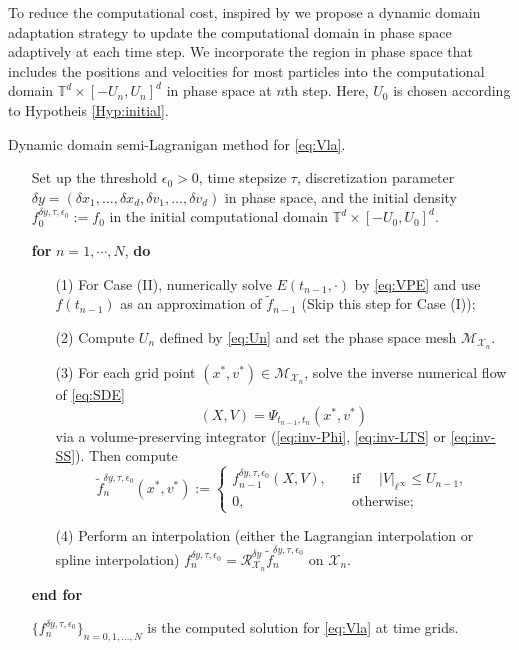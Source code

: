 \documentclass[11pt,reqno]{amsproc}
\numberwithin{equation}{section}
\begin{document}
To reduce the computational cost, inspired by \cite{LR23} we propose a dynamic domain adaptation strategy to update the computational domain in phase space adaptively at each time step. We  incorporate 
the region in phase space that includes the positions and velocities for most particles into the computational domain $\mathbb{T}^d\times [-U_n,U_n]^d$ in phase space at $n$th step. Here, $U_0$ is chosen according to Hypotheis \ref{Hyp:initial}.

\begin{algorithm}[htb]
\caption{Dynamic domain semi-Lagranigan method for \eqref{eq:Vla}.}\label{Algo:2}
\begin{itemize}[leftmargin=*]
\item[]
Set up the threshold $\epsilon_0>0$, time stepsize $\tau$,  discretization parameter  $\delta y=(\delta x_1,\ldots,\delta x_d,\delta v_1,\ldots,\delta v_d)$ in phase space, and the
initial density $f^{\delta y,\tau,\epsilon_0}_{0}:=f_0$ in the initial computational domain $\mathbb{T}^d\times[-U_0,U_0]^d$.

\item[] 
\textbf{for} $n=1, \cdots,N$, \textbf{do}

\begin{enumerate}
\item[(1)]
For Case (II), numerically solve $E(t_{n-1},\cdot)$ by \eqref{eq:VPE} and use $f(t_{n-1})$ as an approximation of $\widetilde{f}_{n-1}$ (Skip this step for Case (I));


\item[(2)]
Compute $U_n$ defined by \eqref{eq:Un} and set the phase space mesh
$\mathcal M_{\mathscr{X}_n}$. 



\item[(3)]
For each grid point $(x^*,v^*)\in\mathcal M_{\mathscr{X}_n}$, solve the inverse numerical flow of \eqref{eq:SDE} $$(X,V)=\widehat{\Psi}_{t_{n-1},t_{n}}(x^*,v^*)$$ 
via a volume-preserving integrator (\eqref{eq:inv-Phi}, \eqref{eq:inv-LTS} or \eqref{eq:inv-SS}).  Then compute
\begin{equation*}%
 \tilde{f}^{\delta y,\tau,\epsilon_0}_{n}(x^*,v^*):= 
 \begin{cases}
 f^{\delta y,\tau,\epsilon_0}_{n-1}(X,V),\quad
 &\text{if } \quad |V|_{\ell^\infty}\le U_{n-1},\\
 0,\quad &\text{otherwise};
 \end{cases}
\end{equation*}

\item[(4)]
Perform an interpolation (either the Lagrangian interpolation or spline interpolation)
 $f^{\delta y,\tau,\epsilon_0}_{n}=
\mathscr{R}_{\mathscr{X}_n}^{\delta y}\tilde{f}^{\delta y,\tau,\epsilon_0}_{n}$ on $\mathscr{X}_n$.
\end{enumerate}

\textbf{end for}

\item[] 
$\{f_n^{\delta y,\tau,\epsilon_0}\}_{n=0,1,\ldots,N}$ is the computed solution for \eqref{eq:Vla} at time grids.
\end{itemize}

\end{algorithm}
\end{document}
